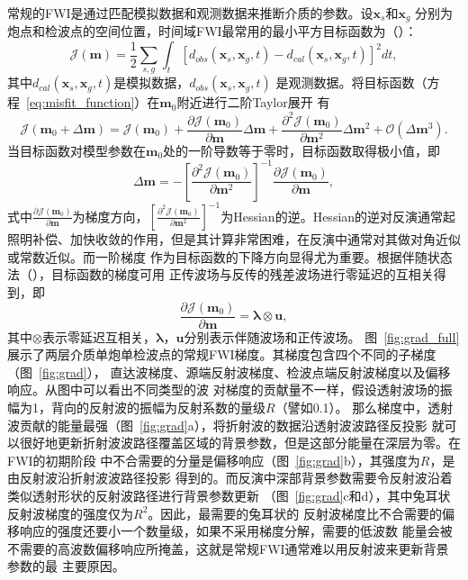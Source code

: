 常规的FWI是通过匹配模拟数据和观测数据来推断介质的参数。设$\mathbf{x}_s$和$\mathbf{x}_g$
分别为炮点和检波点的空间位置，时间域FWI最常用的最小平方目标函数为（）：
\begin{equation}
    \mathcal{J}(\mathbf{m})=\frac{1}{2}\sum_{s,g}\int_t[d_{obs}(\mathbf{x}_s,\mathbf{x}_g,t)
	        -d_{cal}(\mathbf{x}_s,\mathbf{x}_g,t)]^2dt,
	\label{eq:misfit_function}
\end{equation}
其中$d_{cal}(\mathbf{x}_s,\mathbf{x}_g,t)$是模拟数据，$d_{obs}(\mathbf{x}_s,\mathbf{x}_g,t)$
是观测数据。将目标函数（方程~\ref{eq:misfit_function}）在$\mathbf{m}_0$附近进行二阶Taylor展开
有
\begin{equation}
	\mathcal{J}(\mathbf{m}_0+\Delta\mathbf{m})=\mathcal{J}(\mathbf{m}_0)
	+\frac{\partial\mathcal{J}(\mathbf{m}_0)}{\partial\mathbf{m}}\Delta\mathbf{m}
	+\frac{\partial^2\mathcal{J}(\mathbf{m}_0)}{\partial\mathbf{m}^2}\Delta\mathbf{m}^2 
	+ \mathcal{O}(\Delta\mathbf{m}^3).
\end{equation}
当目标函数对模型参数在$\mathbf{m}_0$处的一阶导数等于零时，目标函数取得极小值，即
\begin{equation}
	\Delta\mathbf{m}=-[\frac{\partial^2\mathcal{J}(\mathbf{m}_0)}{\partial\mathbf{m}^2}]^{-1}
	\frac{\partial\mathcal{J}(\mathbf{m}_0)}{\partial\mathbf{m}},
\end{equation}
式中$\frac{\partial\mathcal{J}(\mathbf{m}_0)}{\partial\mathbf{m}}$为梯度方向，$[\frac{\partial^2
\mathcal{J}(\mathbf{m}_0)}{\partial\mathbf{m}^2}]^{-1}$为Hessian的逆。Hessian的逆对反演通常起
照明补偿、加快收敛的作用，但是其计算非常困难，在反演中通常对其做对角近似或常数近似。而一阶梯度
作为目标函数的下降方向显得尤为重要。根据伴随状态法（），目标函数的梯度可用
正传波场与反传的残差波场进行零延迟的互相关得到，即
\begin{equation}
	\frac{\partial\mathcal{J}(\mathbf{m}_0)}{\partial\mathbf{m}} = \mathbf{\lambda}\otimes\mathbf{u},
\end{equation}
其中$\otimes$表示零延迟互相关，$\mathbf{\lambda}$，$\mathbf{u}$分别表示伴随波场和正传波场。
图~\ref{fig:grad_full}展示了两层介质单炮单检波点的常规FWI梯度。其梯度包含四个不同的子梯度
（图~\ref{fig:grad}），
直达波梯度、源端反射波梯度、检波点端反射波梯度以及偏移响应。从图中可以看出不同类型的波
对梯度的贡献量不一样，假设透射波场的振幅为1，背向的反射波的振幅为反射系数的量级$R$（譬如0.1）。
那么梯度中，透射波贡献的能量最强（图~\ref{fig:grad}a），将折射波的数据沿透射波波路径反投影
就可以很好地更新折射波波路径覆盖区域的背景参数，但是这部分能量在深层为零。在FWI的初期阶段
中不合需要的分量是偏移响应（图~\ref{fig:grad}b），其强度为$R$，是由反射波沿折射波波路径投影
得到的。而反演中深部背景参数需要令反射波沿着类似透射形状的反射波路径进行背景参数更新
（图~\ref{fig:grad}c和d），其中兔耳状反射波梯度的强度仅为$R^2$。因此，最需要的兔耳状的
反射波梯度比不合需要的偏移响应的强度还要小一个数量级，如果不采用梯度分解，需要的低波数
能量会被不需要的高波数偏移响应所掩盖，这就是常规FWI通常难以用反射波来更新背景参数的最
主要原因。

